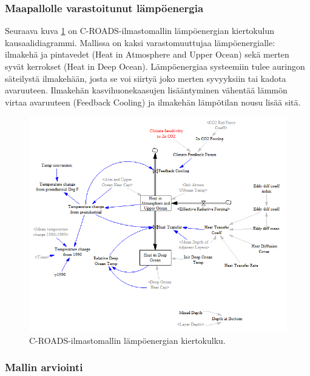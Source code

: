 \documentclass[finnish,12pt,a4paper,pdftex]{article}
\begin{document}
\begin{onehalfspacing}
\clearpage

\subsubsection*{Maapallolle varastoitunut lämpöenergia \label{ilmasto:croads:lampo}}

Seuraava kuva \ref{ilmasto:heat} on C-ROADS-ilmastomallin lämpöenergian kiertokulun kausaalidiagrammi. Mallissa on kaksi varastomuuttujaa lämpöenergialle: ilmakehä ja pintavedet (Heat in Atmosphere and Upper Ocean) sekä merten syvät kerrokset (Heat in Deep Ocean). Lämpöenergiaa systeemiin tulee auringon säteilystä ilmakehään, josta se voi siirtyä joko merten syvyyksiin tai kadota avaruuteen. Ilmakehän kasvihuonekaasujen lisääntyminen vähentää lämmön virtaa avaruuteen (Feedback Cooling) ja ilmakehän lämpötilan nousu lisää sitä. 


\begin{figure}[H]
\centering \includegraphics[width=\textwidth]{c-roads-heat}
\caption{C-ROADS-ilmastomallin lämpöenergian kiertokulku. \cite{Croads} \label{ilmasto:heat}}
\end{figure}

\subsubsection*{Mallin arviointi \label{ilmasto:croads:arviointi}}

\clearpage


\end{onehalfspacing}
\end{document}
